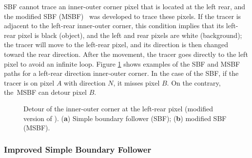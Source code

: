 \documentclass[sensors,article,accept,moreauthors,pdftex,10pt,a4paper]{mdpi}
\begin{document}
SBF cannot trace an inner-outer corner pixel that is located at the left rear, and the modified SBF (MSBF)~\cite{Gose1996Pattern} was developed to trace these pixels. If the tracer is adjacent to the left-rear inner-outer corner, this condition implies that its left-rear pixel is black (object), and the left and rear pixels are white (background); the tracer will move to the left-rear pixel, and its direction is then changed toward the rear direction. After the movement, the tracer goes directly to the left pixel to avoid an infinite loop. Figure \ref{fig:image3} shows examples of the SBF and MSBF paths for a left-rear direction inner-outer corner. In the case of the SBF, if the tracer is on pixel $A$ with direction $N$, it misses pixel $B$. On the contrary, the~MSBF can detour pixel $B$.

\begin{figure}[H]
	\centering
	 
	\caption{Detour of the inner-outer corner at the left-rear pixel (modified version of \cite{Gose1996Pattern}). (\textbf{a}) Simple boundary follower (SBF); (\textbf{b}) modified SBF (MSBF).}
	\label{fig:image3}
\end{figure}

\subsubsection{Improved Simple Boundary Follower}

\end{document}
